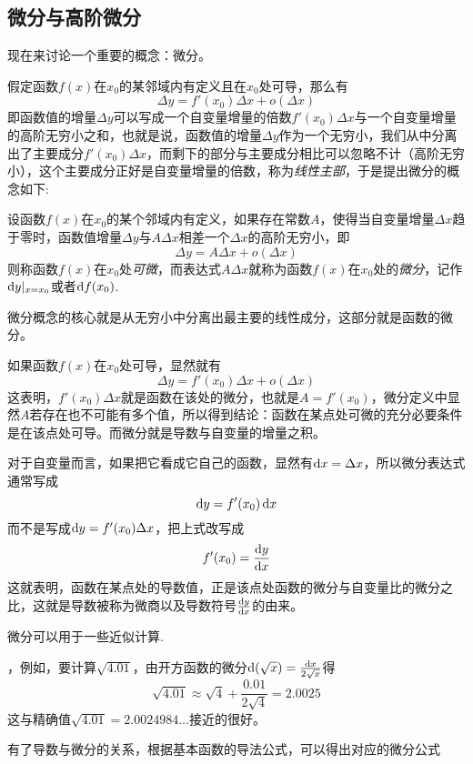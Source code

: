 \subsection{微分与高阶微分}
\label{sec:difference-and-high-level-difference}

现在来讨论一个重要的概念：微分。

假定函数$f(x)$在$x_0$的某邻域内有定义且在$x_0$处可导，那么有
\[ \Delta y = f'(x_0)\Delta x + o(\Delta x) \]
即函数值的增量$\Delta y$可以写成一个自变量增量的倍数$f'(x_0)\Delta x$与一个自变量增量的高阶无穷小之和，也就是说，函数值的增量$\Delta y$作为一个无穷小，我们从中分离出了主要成分$f'(x_0)\Delta x$，而剩下的部分与主要成分相比可以忽略不计（高阶无穷小），这个主要成分正好是自变量增量的倍数，称为\emph{线性主部}，于是提出微分的概念如下:
\begin{definition}
  设函数$f(x)$在$x_0$的某个邻域内有定义，如果存在常数$A$，使得当自变量增量$\Delta x$趋于零时，函数值增量$\Delta y$与$A\Delta x$相差一个$\Delta x$的高阶无穷小，即
  \[ \Delta y = A \Delta x + o(\Delta x) \]
  则称函数$f(x)$在$x_0$处\emph{可微}，而表达式$A\Delta x$就称为函数$f(x)$在$x_0$处的\emph{微分}，记作$\mathop{}\!\mathrm{d} y |_{x=x_0}$或者$\mathop{}\!\mathrm{d} f(x_0)$.
\end{definition}

微分概念的核心就是从无穷小中分离出最主要的线性成分，这部分就是函数的微分。

如果函数$f(x)$在$x_0$处可导，显然就有
\[ \Delta y = f'(x_0)\Delta x + o(\Delta x) \]
这表明，$f'(x_0)\Delta x$就是函数在该处的微分，也就是$A=f'(x_0)$，微分定义中显然$A$若存在也不可能有多个值，所以得到结论：函数在某点处可微的充分必要条件是在该点处可导。而微分就是导数与自变量的增量之积。

对于自变量而言，如果把它看成它自己的函数，显然有$\mathop{}\!\mathrm{d} x = \Delta x$，所以微分表达式通常写成
\[ \mathop{}\!\mathrm{d} y = f'(x_0) \mathop{}\!\mathrm{d} x \]
而不是写成$\mathop{}\!\mathrm{d} y = f'(x_0) \Delta x$，把上式改写成
\[ f'(x_0) = \frac{\mathop{}\!\mathrm{d} y}{\mathop{}\!\mathrm{d} x} \]
这就表明，函数在某点处的导数值，正是该点处函数的微分与自变量比的微分之比，这就是导数被称为微商以及导数符号$\frac{\mathop{}\!\mathrm{d} y}{\mathop{}\!\mathrm{d} x}$的由来。

微分可以用于一些近似计算.

\begin{example}
  ，例如，要计算$\sqrt{4.01}$，由开方函数的微分$\mathop{}\!\mathrm{d} (\sqrt{x})=\frac{\mathop{}\!\mathrm{d} x}{2 \sqrt{x}}$得
  \[ \sqrt{4.01} \approx \sqrt{4} + \frac{0.01}{2 \sqrt{4}} = 2.0025 \]
  这与精确值$\sqrt{4.01}=2.0024984\ldots$接近的很好。
\end{example}

有了导数与微分的关系，根据基本函数的导法公式，可以得出对应的微分公式

